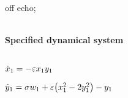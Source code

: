 
off echo;


\(\)
\paragraph{Specified dynamical system}
\(
\)\par

\(\dot x_{1}=-\varepsilon x_{1} y_{1}
\)\par

\(\dot y_{1}=\sigma  w_{1}+\varepsilon \big(x_{1}^{2}-2 y_{1}^{2}\big)-y_{1}
\)\par
